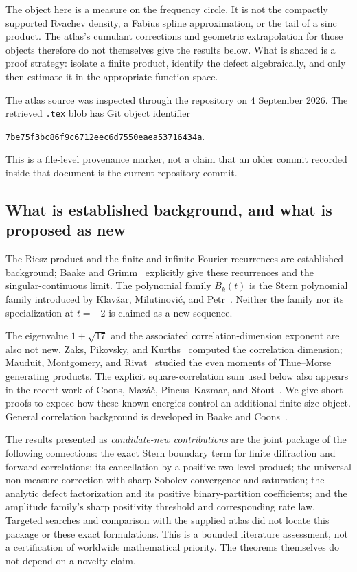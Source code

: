 \documentclass[11pt,a4paper]{article}
\numberwithin{equation}{section}
\theoremstyle{definition}
\theoremstyle{remark}
\begin{document}
The object here is a measure on the frequency circle. It is not the compactly
supported Rvachev density, a Fabius spline approximation, or the tail of a sinc
product. The atlas's cumulant corrections and geometric extrapolation for those
objects therefore do not themselves give the results below. What is shared is a
proof strategy: isolate a finite product, identify the defect algebraically, and only
then estimate it in the appropriate function space.

The atlas source was inspected through the repository on 4 September 2026. The
retrieved \texttt{.tex} blob has Git object identifier
\begin{center}\small\texttt{7be75f3bc86f9c6712eec6d7550eaea53716434a}.\end{center}
This is a file-level provenance marker, not a claim that an older commit recorded
inside that document is the current repository commit.

\subsection{What is established background, and what is proposed as new}
The Riesz product and the finite and infinite Fourier recurrences are established
background; Baake and Grimm~\cite{BG} explicitly give these recurrences and the
singular-continuous limit. The polynomial family $B_k(t)$ is the Stern polynomial
family introduced by Klav\v zar, Milutinovi\'c, and Petr~\cite{Stern}. Neither the
family nor its specialization at $t=-2$ is claimed as a new sequence.

The eigenvalue $1+\sqrt{17}$ and the associated correlation-dimension exponent
are also not new. Zaks, Pikovsky, and Kurths~\cite{ZPK} computed the correlation
dimension; Mauduit, Montgomery, and Rivat~\cite{MMR} studied the even moments of
Thue--Morse generating products. The explicit square-correlation sum used below
also appears in the recent work of Coons, Maz\'a\v c, Pincus--Kazmar, and
Stout~\cite{CMPS}. We give short proofs to expose how these known energies control
an additional finite-size object. General correlation background is developed in
Baake and Coons~\cite{BC}.

The results presented as \emph{candidate-new contributions} are the joint package
of the following connections: the exact Stern boundary term for finite diffraction
and forward correlations; its cancellation by a positive two-level product; the
universal non-measure correction with sharp Sobolev convergence and saturation;
the analytic defect factorization and its positive binary-partition coefficients;
and the amplitude family's sharp positivity threshold and corresponding rate
law. Targeted searches and comparison with the supplied atlas did not locate this
package or these exact formulations. This is a bounded literature assessment,
not a certification of worldwide mathematical priority. The theorems themselves
do not depend on a novelty claim.
\end{document}
